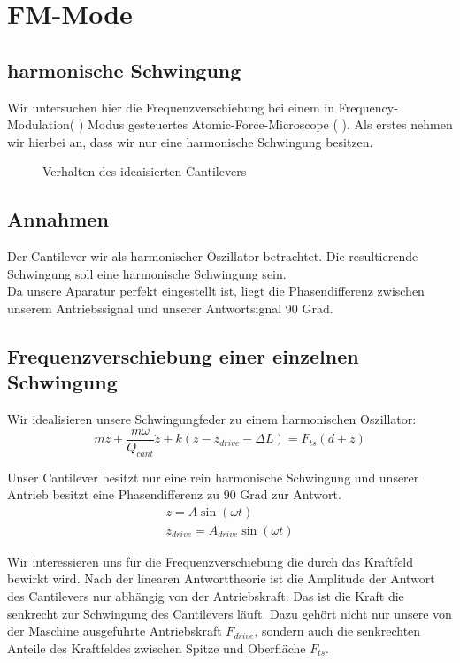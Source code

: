 \section{FM-Mode}
\subsection{harmonische Schwingung}
Wir untersuchen hier die Frequenzverschiebung bei einem in Frequency-Modulation( \FM ) Modus gesteuertes Atomic-Force-Microscope ( \AFM ). Als erstes nehmen wir hierbei an, dass wir nur eine harmonische Schwingung besitzen.


\begin{figure}[H]
	\begin{tikzpicture}

	\end{tikzpicture}
	\caption{Verhalten des ideaisierten Cantilevers}
\end{figure}
\subsection{Annahmen}
Der Cantilever wir als harmonischer Oszillator betrachtet. Die resultierende Schwingung soll eine harmonische Schwingung sein.\\
Da unsere Aparatur perfekt eingestellt ist, liegt die Phasendifferenz zwischen unserem Antriebssignal und unserer Antwortsignal 90 Grad.

\subsection{Frequenzverschiebung einer einzelnen Schwingung}

Wir idealisieren unsere Schwingungfeder zu einem harmonischen Oszillator:
\begin{equation}
	m \ddot{z} + \frac{m \omega}{Q_{cant}} \dot{z} + k \left( z-z_{drive} - \Delta L \right) = F_{ts} (d+z) \label{federgleichung} 
\end{equation}

Unser Cantilever besitzt nur eine rein harmonische Schwingung und unserer Antrieb besitzt eine Phasendifferenz zu 90 Grad zur Antwort.
\begin{gather}
	z = A \sin ( \omega t) \\ 
	z_{drive} = A_{drive} \sin ( \omega t)
\end{gather}

Wir interessieren uns für die Frequenzverschiebung die durch das Kraftfeld bewirkt wird.
Nach der linearen Antworttheorie ist die Amplitude der Antwort des Cantilevers nur abhängig von der Antriebskraft. Das ist die Kraft die senkrecht zur Schwingung des Cantilevers läuft. Dazu gehört nicht nur unsere von der Maschine ausgeführte Antriebskraft $F_{drive}$, sondern auch die senkrechten Anteile des Kraftfeldes zwischen Spitze und Oberfläche $F_{ts}$.

